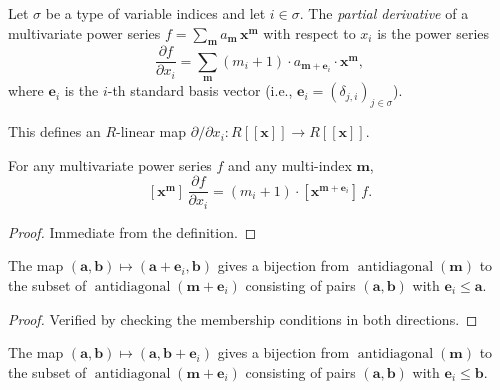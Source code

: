 \begin{definition}
\label{def.fps.mulvar.partialDeriv}
\leanhelper
\leanok
Let $\sigma$ be a type of variable indices and let $i \in \sigma$.
The \emph{partial derivative} of a multivariate power series
$f = \sum_{\mathbf{m}} a_{\mathbf{m}}\, \mathbf{x}^{\mathbf{m}}$
with respect to $x_i$ is the power series
\[
\frac{\partial f}{\partial x_i}
= \sum_{\mathbf{m}} (m_i + 1) \cdot a_{\mathbf{m} + \mathbf{e}_i}
  \cdot \mathbf{x}^{\mathbf{m}},
\]
where $\mathbf{e}_i$ is the $i$-th standard basis vector
(i.e., $\mathbf{e}_i = (\delta_{j,i})_{j \in \sigma}$).

This defines an $R$-linear map $\partial/\partial x_i \colon
R[[\mathbf{x}]] \to R[[\mathbf{x}]]$.
\end{definition}

\begin{lemma}
\label{lem.fps.mulvar.coeff-partialDeriv}
\leanhelper
\leanok
For any multivariate power series $f$ and any multi-index $\mathbf{m}$,
\[
[\mathbf{x}^{\mathbf{m}}]\, \frac{\partial f}{\partial x_i}
= (m_i + 1) \cdot [\mathbf{x}^{\mathbf{m} + \mathbf{e}_i}]\, f.
\]
\end{lemma}

\begin{proof}
Immediate from the definition.
\end{proof}

\begin{lemma}
\label{lem.fps.mulvar.antidiag-shift-fst}
\leanhelper
\leanok
The map $(\mathbf{a}, \mathbf{b}) \mapsto (\mathbf{a} + \mathbf{e}_i, \mathbf{b})$ gives a bijection from
$\operatorname{antidiagonal}(\mathbf{m})$ to the subset of
$\operatorname{antidiagonal}(\mathbf{m} + \mathbf{e}_i)$ consisting of
pairs $(\mathbf{a}, \mathbf{b})$ with $\mathbf{e}_i \leq \mathbf{a}$.
\end{lemma}

\begin{proof}
Verified by checking the membership conditions in both directions.
\end{proof}

\begin{lemma}
\label{lem.fps.mulvar.antidiag-shift-snd}
\leanhelper
\leanok
The map $(\mathbf{a}, \mathbf{b}) \mapsto (\mathbf{a}, \mathbf{b} + \mathbf{e}_i)$ gives a bijection from
$\operatorname{antidiagonal}(\mathbf{m})$ to the subset of
$\operatorname{antidiagonal}(\mathbf{m} + \mathbf{e}_i)$ consisting of
pairs $(\mathbf{a}, \mathbf{b})$ with $\mathbf{e}_i \leq \mathbf{b}$.
\end{lemma}

